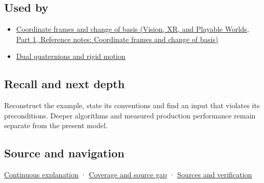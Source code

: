 \subsection{Used by}\label{appendix-0bf0ca73f735-used-by}

\hypertarget{appendix-0bf0ca73f735-used-by}{}

\begin{itemize}
\tightlist
\item
  \href{../07-Vision-XR-and-Playable-Worlds-P01/main.pdf\#appendix-1bae9457dbc3}{Coordinate frames and change of basis (Vision, XR, and Playable Worlds, Part 1, Reference notes: Coordinate frames and change of basis)}
\item
  \hyperref[appendix-d1ea57347893]{Dual quaternions and rigid motion}
\end{itemize}

\subsection{Recall and next depth}\label{appendix-0bf0ca73f735-recall-and-next-depth}

\hypertarget{appendix-0bf0ca73f735-recall-and-next-depth}{}

Reconstruct the example, state its conventions and find an input that violates its preconditions. Deeper algorithms and measured production performance remain separate from the present model.

\subsection{Source and navigation}\label{appendix-0bf0ca73f735-source-and-navigation}

\hypertarget{appendix-0bf0ca73f735-source-and-navigation}{}

\hyperref[01-foundations-i-ch018-keep-the-promises-visible-while-moving-between-representations]{Continuous explanation} · \hyperref[appendix-fd090d982a15-phase-7---parts-601-700]{Coverage and source gap} · \hyperref[appendix-a103e7846d21-phase-7---source-analysis-and-verification]{Sources and verification}
